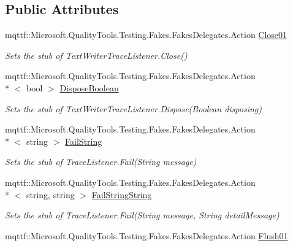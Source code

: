 \subsection*{Public Attributes}
\begin{DoxyCompactItemize}
\item 
mqttf\-::\-Microsoft.\-Quality\-Tools.\-Testing.\-Fakes.\-Fakes\-Delegates.\-Action \hyperlink{class_system_1_1_diagnostics_1_1_fakes_1_1_stub_text_writer_trace_listener_a0266e81857875ef57e138bf7eb8fab18}{Close01}
\begin{DoxyCompactList}\small\item\em Sets the stub of Text\-Writer\-Trace\-Listener.\-Close()\end{DoxyCompactList}\item 
mqttf\-::\-Microsoft.\-Quality\-Tools.\-Testing.\-Fakes.\-Fakes\-Delegates.\-Action\\*
$<$ bool $>$ \hyperlink{class_system_1_1_diagnostics_1_1_fakes_1_1_stub_text_writer_trace_listener_a369115082d3e84038b42b05f2634a2be}{Dispose\-Boolean}
\begin{DoxyCompactList}\small\item\em Sets the stub of Text\-Writer\-Trace\-Listener.\-Dispose(\-Boolean disposing)\end{DoxyCompactList}\item 
mqttf\-::\-Microsoft.\-Quality\-Tools.\-Testing.\-Fakes.\-Fakes\-Delegates.\-Action\\*
$<$ string $>$ \hyperlink{class_system_1_1_diagnostics_1_1_fakes_1_1_stub_text_writer_trace_listener_a9009dd4ba9ce9f4bd0562ec1e7d93ddf}{Fail\-String}
\begin{DoxyCompactList}\small\item\em Sets the stub of Trace\-Listener.\-Fail(\-String message)\end{DoxyCompactList}\item 
mqttf\-::\-Microsoft.\-Quality\-Tools.\-Testing.\-Fakes.\-Fakes\-Delegates.\-Action\\*
$<$ string, string $>$ \hyperlink{class_system_1_1_diagnostics_1_1_fakes_1_1_stub_text_writer_trace_listener_ae44f7757c0162d843444891df3441b2c}{Fail\-String\-String}
\begin{DoxyCompactList}\small\item\em Sets the stub of Trace\-Listener.\-Fail(\-String message, String detail\-Message)\end{DoxyCompactList}\item 
mqttf\-::\-Microsoft.\-Quality\-Tools.\-Testing.\-Fakes.\-Fakes\-Delegates.\-Action \hyperlink{class_system_1_1_diagnostics_1_1_fakes_1_1_stub_text_writer_trace_listener_a63433756be6379b1d2479191d5c5a6fb}{Flush01}

\end{DoxyCompactItemize}
